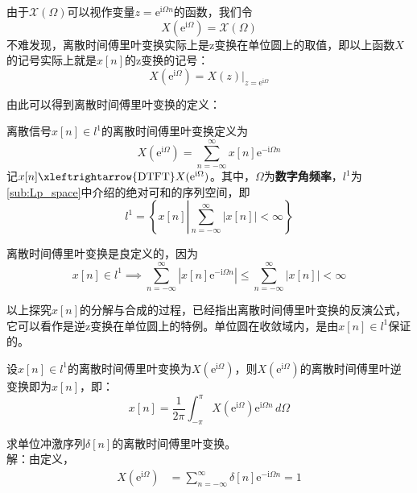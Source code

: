 \documentclass{ctexbook}
\begin{document}
由于$\mathcal{X} (\Omega)$可以视作变量$z=\mathrm{e}^{\mathrm{i}\Omega n}$的函数，我们令
$$X(\mathrm{e}^{\mathrm{i}\Omega})=\mathcal{X} (\Omega)$$
不难发现，离散时间傅里叶变换实际上是z变换在单位圆上的取值，即以上函数$X$的记号实际上就是$x[n]$的z变换的记号：
\[X(\mathrm{e}^{\mathrm{i}\Omega})=X(z)|_{z=\mathrm{e}^{\mathrm{i}\Omega}}\]

由此可以得到离散时间傅里叶变换的定义：

\begin{definition}[离散时间傅里叶变换]
    离散信号$x[n]\in l^1$的离散时间傅里叶变换定义为
    \[X(\mathrm{e}^{\mathrm{i}\Omega})=\sum_{n=-\infty}^{\infty}x[n]\mathrm{e}^{-\mathrm{i}\Omega n}\]
    记$x[n]\xleftrightarrow{\text{DTFT}}X(\mathrm{e}^{\mathrm{i}\Omega})$。其中，$\Omega $为\textbf{数字角频率}，$l^1$为\ref{sub:Lp_space}中介绍的绝对可和的序列空间，即
    \[l^1=\left\{x[n]\left|\sum_{n=-\infty}^{\infty}|x[n]|<\infty\right.\right\}\]
\end{definition}

离散时间傅里叶变换是良定义的，因为
\[x[n]\in l^1\implies \sum_{n=-\infty}^{\infty}\left|x[n]\mathrm{e}^{-\mathrm{i}\Omega n}\right|\leq \sum_{n=-\infty}^{\infty}|x[n]|<\infty\]

以上探究$x[n]$的分解与合成的过程，已经指出离散时间傅里叶变换的反演公式，它可以看作是逆z变换在单位圆上的特例。单位圆在收敛域内，是由$x[n]\in l^1$保证的。
\begin{theorem}[离散时间傅里叶反演公式]
    设$x[n]\in l^1$的离散时间傅里叶变换为$X(\mathrm{e}^{\mathrm{i}\Omega})$，则$X(\mathrm{e}^{\mathrm{i}\Omega})$的离散时间傅里叶逆变换即为$x[n]$，即：
    \[x[n]=\frac{1}{2\pi}\int_{-\pi}^{\pi}X(\mathrm{e}^{\mathrm{i}\Omega})\mathrm{e}^{\mathrm{i}\Omega n}\,d\Omega\]
\end{theorem}

\begin{example}
    求单位冲激序列$\delta[n]$的离散时间傅里叶变换。\\
    解：由定义，
    \begin{align*}
        X(\mathrm{e}^{\mathrm{i}\Omega})&=\sum_{n=-\infty}^{\infty}\delta[n]\mathrm{e}^{-\mathrm{i}\Omega n}=1
    \end{align*}
\end{example}
\end{document}

